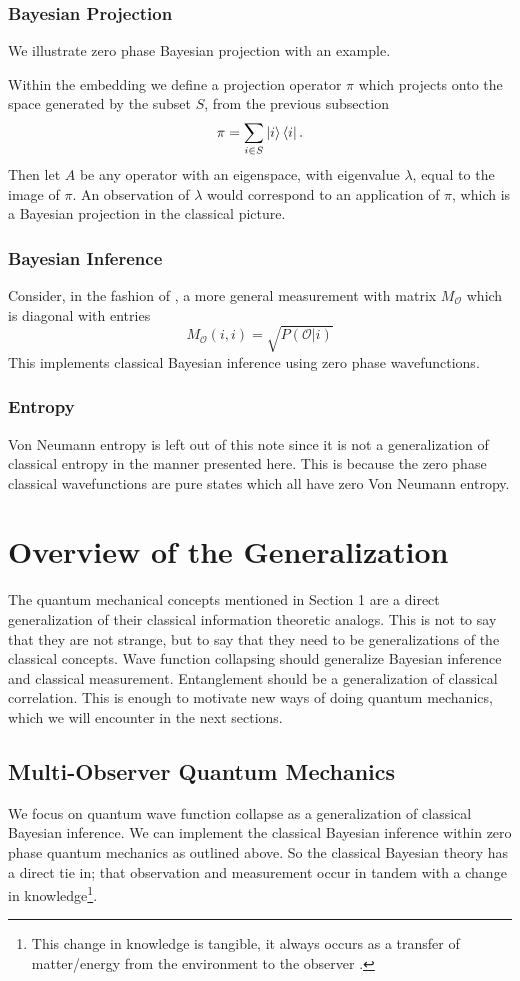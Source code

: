 \documentclass[12pt,a4paper]{article}
\begin{document}
\subsubsection{Bayesian Projection}
We illustrate zero phase Bayesian projection with an example.

Within the embedding we define a projection operator $\pi$ which projects onto the space generated by the subset $S$, from the previous subsection
\[
\pi = \sum_{i \in S} \ket{i} \bra{i}.
\]
Then let $A$ be any operator with an eigenspace, with eigenvalue $\lambda$, equal to the image of $\pi$.  An observation of $\lambda$ would correspond to an application of $\pi$, which is a Bayesian projection in the classical picture.

\subsubsection{Bayesian Inference}
Consider, in the fashion of \cite{nielsenchuang}, a more general measurement with matrix $M_\mathcal{O}$ which is diagonal with entries
\[
   M_\mathcal{O}(i,i) = \sqrt{P(\mathcal{O} | i)}
\]
This implements classical Bayesian inference using zero phase wavefunctions.


\subsubsection{Entropy}
Von Neumann entropy is left out of this note since it is not a generalization of classical entropy in the manner presented here.  This is because the zero phase classical wavefunctions are pure states which all have zero Von Neumann entropy.

\section{Overview of the Generalization}

The quantum mechanical concepts mentioned in Section 1 are a direct generalization of their classical information theoretic analogs.  This is not to say that they are not strange, but to say that they need to be generalizations of the classical concepts.  Wave function collapsing should generalize Bayesian inference and classical measurement.  Entanglement should be a generalization of classical correlation.  This is enough to motivate new ways of doing quantum mechanics, which we will encounter in the next sections.

\subsection{Multi-Observer Quantum Mechanics}
We focus on quantum wave function collapse as a generalization of classical Bayesian inference.  We can implement the classical Bayesian inference within zero phase quantum mechanics as outlined above.  So the classical Bayesian theory has a direct tie in; that observation and measurement occur in tandem with a change in knowledge\footnote{This change in knowledge is tangible, it always occurs as a transfer of matter/energy from the environment to the observer \cite{thrust}.}.  
\end{document}
